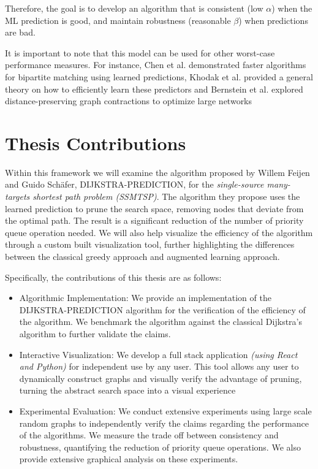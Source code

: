 Therefore, the goal is to develop an algorithm that is consistent (low $\alpha$) when the ML prediction is good, and maintain robustness (reasonable $\beta$) when predictions are bad.
 
It is important to note that this model can be used for other worst-case performance measures. For instance, Chen et al.\cite{chenFasterFundamentalGraph2022} 
demonstrated faster algorithms for bipartite matching using learned predictions, 
Khodak et al.\cite{khodakLearningPredictionsAlgorithms2022} provided a general theory on how to efficiently learn these predictors 
and Bernstein et al.\cite{bernsteinDistancepreservingGraphContractions2019} explored distance-preserving graph contractions to optimize large networks


\section{Thesis Contributions}
Within this framework we will examine the algorithm proposed by Willem Feijen and Guido Schäfer\cite{feijenDijkstrasAlgorithmPredictions2023},
\textsc{DIJKSTRA-PREDICTION}, for the \textit{single-source many-targets shortest path problem (SSMTSP)}.
The algorithm they propose uses the learned prediction to prune the search space, removing nodes that deviate from the optimal path. 
The result is a significant reduction of the number of priority queue operation needed.
We will also help visualize the efficiency of the algorithm through a custom built visualization tool, 
further highlighting the differences between the classical greedy approach and augmented learning approach.  

Specifically, the contributions of this thesis are as follows:

\begin{itemize}
    \item{Algorithmic Implementation: We provide an implementation of the \textsc{DIJKSTRA-PREDICTION}\cite{feijenDijkstrasAlgorithmPredictions2023} algorithm for the verification of the efficiency of the algorithm. We benchmark the algorithm against the classical Dijkstra's algorithm to further validate the claims.}
    \item{Interactive Visualization: We develop a full stack application \textit{(using React and Python)} for independent use by any user. This tool allows any user to dynamically construct graphs and visually verify the advantage of pruning, turning the abstract search space into a visual experience}
    \item{Experimental Evaluation: We conduct extensive experiments using large scale random graphs to independently verify the claims regarding the performance of the algorithms. We measure the trade off between consistency and robustness, quantifying the reduction of priority queue operations. We also provide extensive graphical analysis on these experiments.}
\end{itemize}

